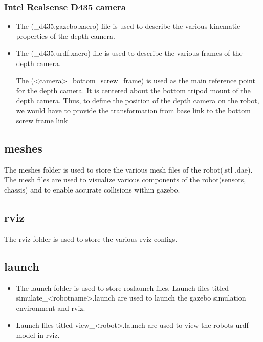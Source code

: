 \documentclass[11pt]{article}
\begin{document}
\subsubsection{Intel Realsense D435 camera}
\begin{itemize}
 \item {
       The (\_d435.gazebo.xacro) file is used to describe the various kinematic properties of the depth camera.
       }
 \item{
       The (\_d435.urdf.xacro) file is used to describe the various frames of the depth camera.
       
       The (<camera>\_bottom\_screw\_frame) is used as the main reference point for the depth camera. It is centered about the bottom tripod mount of the depth camera.
       Thus, to define the position of the depth camera on the robot, we would have to provide the transformation from base link to the bottom screw frame link
       }
\end{itemize}

\subsection{meshes}
The meshes folder is used to store the various mesh files of the robot(.stl .dae).
The mesh files are used to visualize various components of the robot(sensors, chassis) and to enable accurate collisions within gazebo.

\subsection{rviz}
The rviz folder is used to store the various rviz configs.

\subsection{launch}
\begin{itemize}
 \item{
       
       The launch folder is used to store roslaunch files. Launch files titled simulate\_<robotname>.launch are used to launch the gazebo simulation environment and rviz.
       }
 \item{
       Launch files titled view\_<robot>.launch are used to view the robots urdf model in rviz.
       }
\end{itemize}


\end{document}
